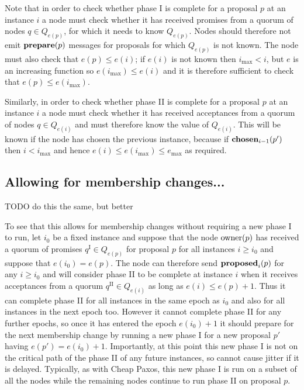 \documentclass[journal]{IEEEtran}
\begin{document}
Note that in order to check whether phase I is complete for a proposal $p$ at
an instance $i$ a node must check whether it has received promises from a
quorum of nodes $q \in Q_{e(p)}$, for which it needs to know $Q_{e(p)}$.  Nodes
should therefore not emit $\mathbf{prepare}(p)$ messages for proposals for which
$Q_{e(p)}$ is not known. The node must also check that $e(p) \le e(i)$; if
$e(i)$ is not known then $i_\mathrm{max} < i$, but $e$ is an increasing
function so $e(i_\mathrm{max}) \le e(i)$ and it is therefore sufficient to
check that $e(p) \le e(i_\mathrm{max})$.

Similarly, in order to check whether phase II is complete for a proposal $p$ at
an instance $i$ a node must check whether it has received acceptances from a
quorum of nodes $q \in Q_{e(i)}$ and must therefore know the value of
$Q_{e(i)}$. This will be known if the node has chosen the previous instance,
because if $\mathbf{chosen}_{i-1}(p')$ then $i < i_\mathrm{max}$ and hence $e(i) \le
e(i_\mathrm{max}) \le e_\mathrm{max}$ as required.

\subsection{Allowing for membership changes...}

TODO do this the same, but better

To see that this allows for membership changes without requiring a new phase I
to run, let $i_0$ be a fixed instance and suppose that the node $\mathrm{owner}(p)$ has
received a quorum of promises $q^\textrm{I} \in Q_{e(p)}$ for proposal $p$ for
all instances $i \ge i_0$ and suppose that $e(i_0) = e(p)$. The node can
therefore send $\mathbf{proposed}_{i}(p)$ for any $i \ge i_0$ and will consider phase II to
be complete at instance $i$ when it receives acceptances from a quorum
$q^\textrm{II} \in Q_{e(i)}$ as long as $e(i) \le e(p) + 1$. Thus it can
complete phase II for all instances in the same epoch as $i_0$ and also for all
instances in the next epoch too.  However it cannot complete phase II for any
further epochs, so once it has entered the epoch $e(i_0) + 1$ it should prepare
for the next membership change by running a new phase I for a new proposal $p'$
having $e(p') = e(i_0) + 1$. Importantly, at this point this new phase I is not
on the critical path of the phase II of any future instances, so cannot cause
jitter if it is delayed. Typically, as with Cheap Paxos, this new phase I is
run on a subset of all the nodes while the remaining nodes continue to run
phase II on proposal $p$.
\end{document}

